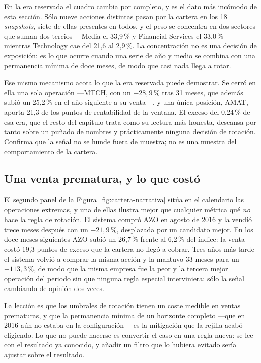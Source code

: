 En la era reservada el cuadro cambia por completo, y es el dato más incómodo de esta sección. Sólo
nueve acciones distintas pasan por la cartera en los 18 \textit{snapshots}, siete de ellas presentes
en todos, y el peso se concentra en dos sectores que suman dos tercios ---Media el 33,9\,\%
y Financial Services el 33,0\,\%--- mientras Technology cae del 21,6 al 2,9\,\%. La concentración no
es una decisión de exposición: es lo que ocurre cuando una serie de año y medio se combina con una
permanencia mínima de doce meses, de modo que casi nada llega a rotar.

Ese mismo mecanismo acota lo que la era reservada puede demostrar. Se cerró en ella una sola
operación ---MTCH, con un $-28{,}9$\,\% tras 31 meses, que además subió un 25,2\,\% en el año
siguiente a su venta---, y una única posición, AMAT, aporta 21,3 de los puntos de rentabilidad de la
ventana. El exceso del 0,24\,\% de esa era, que el resto del capítulo trata como su lectura más
honesta, descansa por tanto sobre un puñado de nombres y prácticamente ninguna decisión de rotación.
Confirma que la señal no se hunde fuera de muestra; no es una muestra del comportamiento de la
cartera.

\subsection{Una venta prematura, y lo que costó}

El segundo panel de la Figura~\ref{fig:cartera-narrativa} sitúa en el calendario las operaciones
extremas, y una de ellas ilustra mejor que cualquier métrica qué \emph{no} hace la regla de
rotación. El sistema compró AZO en agosto de 2016 y la vendió trece meses después con un
$-21{,}9$\,\%, desplazada por un candidato mejor. En los doce meses siguientes AZO subió un
26,7\,\% frente al 6,2\,\% del índice: la venta costó 19,3 puntos de exceso que la cartera
no llegó a cobrar. Tres años más tarde el sistema volvió a comprar la misma acción y la mantuvo 33
meses para un $+113{,}3$\,\%, de modo que la misma empresa fue la peor y la tercera mejor operación
del periodo sin que ninguna regla especial interviniera: sólo la señal cambiando de opinión dos
veces.

La lección es que los umbrales de rotación tienen un coste medible en ventas prematuras, y que la
permanencia mínima de un horizonte completo ---que en 2016 aún no estaba en la configuración--- es
la mitigación que la rejilla acabó eligiendo. Lo que no puede hacerse es convertir el caso en una
regla nueva: se lee con el resultado ya conocido, y añadir un filtro que lo hubiera evitado sería
ajustar sobre el resultado.

